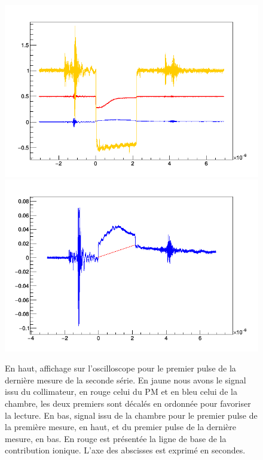 \documentclass[a4paper,11pt]{article}
\begin{document}
\begin{figure}[h]
\begin{center}
\includegraphics[width=\linewidth]{manip_largeur8-6_2.png} 
\includegraphics[width=\linewidth]{manip_largeur8-6_2_chambre.png} 
\caption{\label{fig:manip_largeur8}\footnotesize{En haut, affichage sur l'oscilloscope pour le premier pulse de la dernière mesure de la seconde série. En jaune nous avons le signal issu du collimateur, en rouge celui du PM et en bleu celui de la chambre, les deux premiers sont décalés en ordonnée pour favoriser la lecture. En bas, signal issu de la chambre pour le premier pulse de la première mesure, en haut, et du premier pulse de la dernière mesure, en bas. En rouge est présentée la ligne de base de la contribution ionique. L'axe des abscisses est exprimé en secondes.}}
\end{center}
\end{figure}
\end{document}
